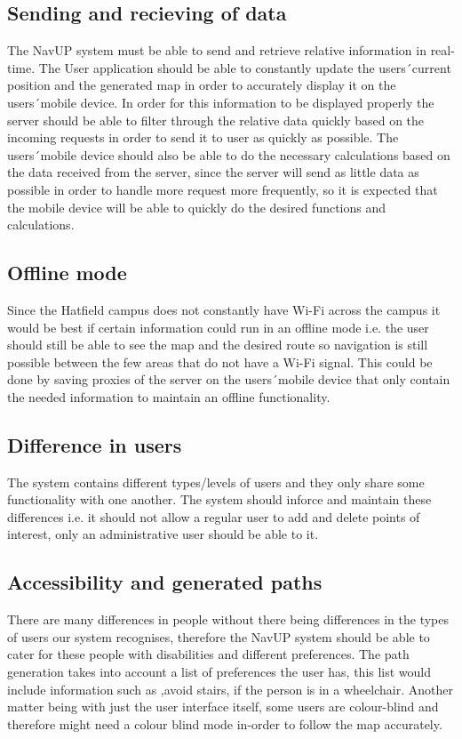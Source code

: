 \documentclass[english]{article}
\begin{document}
	\subsection{Sending and recieving of data}
The NavUP system must be able to send and retrieve relative information in real-time. The User application should be able to constantly update the users\' \ current position and the generated map in order to accurately display it on the users\' \ mobile device. In order for this information to be displayed properly the server should be able to filter through the relative data quickly based on the incoming requests in order to send it to user as quickly as possible. The users\' \ mobile device should also be able to do the necessary calculations based on the data received from the server, since the server will send as little data as possible in order to handle more request more frequently, so it is expected that the mobile device will be able to quickly do the desired functions and calculations. 
	\subsection{Offline mode}
Since the Hatfield campus does not constantly have Wi-Fi across the campus it would be best if certain information could run in an offline mode i.e. the user should still be able to see the map and the desired route so navigation is still possible between the few areas that do not have a Wi-Fi signal. This could be done by saving proxies of the server on the users\' \ mobile device that only contain the needed information to maintain an offline functionality.
	\subsection{Difference in users}
The system contains different types/levels of users and they only share some functionality with one another. The system should inforce and maintain these differences i.e. it should not allow a regular user to add and delete points of interest, only an administrative user should be able to it. 
	\subsection{Accessibility and generated paths}
There are many differences in people without there being differences in the types of users our system recognises, therefore the NavUP system should be able to cater for these people with disabilities and different preferences. The path generation takes into account a list of preferences the user has, this list would include information such as ,avoid stairs,  if the person is in a wheelchair. Another matter being with just the user interface itself, some users are colour-blind and therefore might need a colour blind mode in-order to follow the map accurately.  
\end{document}
